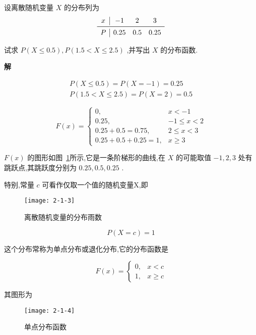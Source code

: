 \begin{example}
	设离散随机变量 $ X $ 的分布列为
	\[ 
	\begin{array}{c|ccc}
	x & -1 & 2 & 3 \\\midrule
	P & 0.25 & 0.5 & 0.25 \\
	\end{array}
	\]
	
	试求 $ P(X \leqslant 0.5), P(1.5<X \leqslant 2.5) $ ,并写出 $ X $ 的分布函数.
	
	\textbf{解}
	
	\[ 
	\begin{array}{l}{P(X \leqslant 0.5)=P(X=-1)=0.25} \\ {P(1.5<X \leqslant 2.5)=P(X=2)=0.5}\end{array}
	\]
	
	\[ 
	F(x)=\left\{\begin{array}{ll}
	{0,} & {x<-1} \\ 
	{0.25,} & {-1 \leqslant x<2} \\ 
	{0.25+0.5=0.75,} & {2 \leqslant x<3} \\ 
	{0.25+0.5+0.25=1,} & {x \geqslant 3}
	\end{array}\right.\]
	
	 $ F(x) $ 的图形如图~\ref{fig:2-1-3}所示,它是一条阶梯形的曲线,在 $ X $ 的可能取值 $ -1,2,3 $ 处有跳跃点,其跳跃度分别为 $ 0.25,0.5,0.25 $ .
	
	
	特别,常量 $ c $ 可看作仅取一个值的随机变量X,即
	
	\begin{figure}
		\centering
		\texttt{[image: 2-1-3]}
		\caption{离散随机变量的分布雨数}
		\label{fig:2-1-3}
	\end{figure}
	
	\[ 
	P(X=c)=1
	\]
	
	这个分布常称为单点分布或退化分布,它的分布函数是
	
	\begin{equation}
	F(x)=\left\{\begin{array}{ll}
	{0,} & {x<c} \\ 
	{1,} & {x \geqslant c}
	\end{array}\right.  \label{eq:2.1.3}
	\end{equation}
	
	其图形为
	\begin{figure}
		\centering
		\texttt{[image: 2-1-4]}
		\caption{单点分布函数}
		\label{fig:2-1-4}
	\end{figure}

\end{example}

